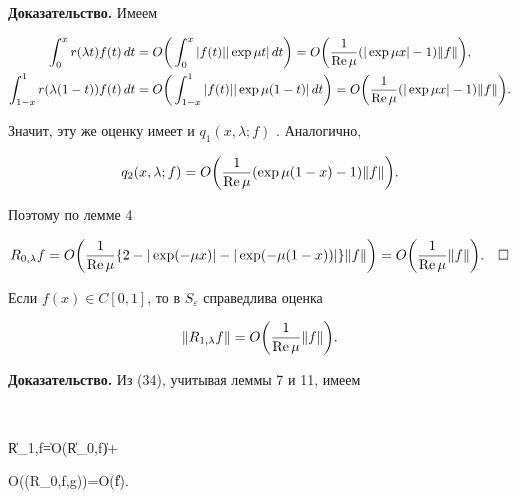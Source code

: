 {\bf Доказательство.} Имеем


\begin{align*}


\int_0^xr(\lambda t)f(t)\, dt&= O\bigg(\int_0^x|f(t)|


|\exp\mu t|\, dt\bigg)=O\bigg(\frac{\di 1}{\di{\RE}\,\mu}


(|\exp\mu x|-1)\|f\|\bigg), \\


%


\int_{1-x}^1r(\lambda(1-t))f(t)\, dt&=


O\bigg(\int_{1-x}^1|f(t)||\exp\mu(1-t)|\, dt\bigg)=


O\bigg(\frac{\di 1}{\di{\RE}\,\mu}(|\exp\mu x|-1)\|f\|\bigg).


\end{align*}


Значит, эту же оценку имеет и $q_1(x,\lambda;f)$ . Аналогично,


$$


q_2(x,\lambda;f)=O\bigg(\frac{\di 1}{\di{\RE}\,\mu}(\exp\mu(1-x)-1)\|f\|


\bigg).


$$


Поэтому по лемме 4


$$


R_{0,\lambda}f= O\bigg(\frac{\di 1}{\di{\RE}\,\mu}\{2-|\exp(-\mu x)|-


|\exp(-\mu(1-x))|\}\|f\|\bigg)=


O\bigg(\frac{\di 1}{\di{\RE}\,\mu}\|f\|\bigg).\quad\square


$$





\begin{lem}


Если $f(x)\in C[0,1]$, то в $S_\varepsilon$ справедлива оценка


$$


\| R_{1,\lambda}f\|=O\bigg(\frac1{{\RE}\,\mu}\|f\|\bigg).


$$


\end{lem}





{\bf Доказательство.} Из (34), учитывая леммы 7 и 11, имеем


$$


\| R_{1,\lambda}f\|=O(\|R_{0,\lambda}f\|)+


O((R_{0,\lambda}f,g))=O\bigg(\|f\|\bigg).\quad\square


